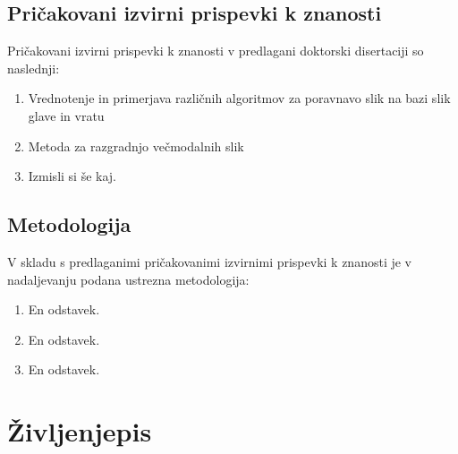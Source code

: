 \documentclass[a4paper,twoside,11pt]{article}
\begin{document}
	  
	  
	
	\subsubsection*{}
	\par{}
	\subsection{Pričakovani izvirni prispevki k znanosti}
	\par{\noindent
		Pričakovani izvirni prispevki k znanosti v predlagani doktorski disertaciji so naslednji:
		\begin{enumerate}
			\item Vrednotenje in primerjava različnih algoritmov za poravnavo slik na bazi slik glave in vratu
			\item Metoda za razgradnjo večmodalnih slik
			\item Izmisli si še kaj.

		\end{enumerate}
	}
	\subsection{Metodologija}
	\par{\noindent
		V skladu s predlaganimi pričakovanimi izvirnimi prispevki k znanosti je v nadaljevanju podana ustrezna metodologija:
		\begin{enumerate}
			\item En odstavek.
			\item En odstavek.
			\item En odstavek.
			
		\end{enumerate}
	}
	\renewcommand{\bibsection}{\subsection{Izbrana literatura}}
	
	\newpage
	\newpage
	\section{Življenjepis}
	
\end{document}
